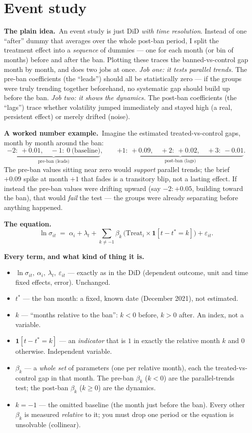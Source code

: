 \documentclass[11pt]{article}
\newcommand{\intuit}{\smallskip\noindent\textbf{The plain idea.}\ }
\newcommand{\example}{\smallskip\noindent\textbf{A worked number example.}\ }
\newcommand{\formula}{\smallskip\noindent\textbf{The equation.}\ }
\newcommand{\vars}{\smallskip\noindent\textbf{Every term, and what kind of thing it is.}\ }
\begin{document}
\section{Event study}

\intuit An event study is just DiD \emph{with time resolution}. Instead of one ``after'' dummy that
averages over the whole post-ban period, I split the treatment effect into a \emph{sequence} of
dummies --- one for each month (or bin of months) before and after the ban. Plotting these traces
the banned-vs-control gap month by month, and does two jobs at once. \emph{Job one: it tests
parallel trends.} The pre-ban coefficients (the ``leads'') should all be statistically zero --- if
the groups were truly trending together beforehand, no systematic gap should build up before the
ban. \emph{Job two: it shows the dynamics.} The post-ban coefficients (the ``lags'') trace whether
volatility jumped immediately and stayed high (a real, persistent effect) or merely drifted (noise).

\example Imagine the estimated treated-vs-control gaps, month by month around the ban:
\[
\underbrace{-2:\ +0.01,\quad -1:\ 0\ \text{(baseline)}}_{\text{pre-ban (leads)}},\qquad
\underbrace{+1:\ +0.09,\quad +2:\ +0.02,\quad +3:\ -0.01}_{\text{post-ban (lags)}}.
\]
The pre-ban values sitting near zero would \emph{support} parallel trends; the brief $+0.09$ spike
at month $+1$ that fades is a transitory blip, not a lasting effect. If instead the pre-ban values
were drifting upward (say $-2: +0.05$, building toward the ban), that would \emph{fail} the test ---
the groups were already separating before anything happened.

\formula
\[
\ln\sigma_{it} \;=\; \alpha_i + \lambda_t + \sum_{k\neq -1}\beta_k\,\big(\mathrm{Treat}_i \times \mathbf{1}[t - t^\ast = k]\big) + \varepsilon_{it}.
\]

\vars
\begin{itemize}
\item $\ln\sigma_{it},\ \alpha_i,\ \lambda_t,\ \varepsilon_{it}$ --- exactly as in the DiD
(dependent outcome, unit and time fixed effects, error). Unchanged.
\item $t^\ast$ --- the ban month: a fixed, known date (December 2021), not estimated.
\item $k$ --- ``months relative to the ban'': $k<0$ before, $k>0$ after. An index, not a variable.
\item $\mathbf{1}[t-t^\ast=k]$ --- an \emph{indicator} that is $1$ in exactly the relative month $k$
and $0$ otherwise. Independent variable.
\item $\beta_k$ --- a \emph{whole set} of parameters (one per relative month), each the
treated-vs-control gap in that month. The pre-ban $\beta_k$ ($k<0$) are the parallel-trends test;
the post-ban $\beta_k$ ($k\ge 0$) are the dynamics.
\item $k=-1$ --- the omitted baseline (the month just before the ban). Every other $\beta_k$ is
measured \emph{relative} to it; you must drop one period or the equation is unsolvable (collinear).
\end{itemize}
\end{document}
